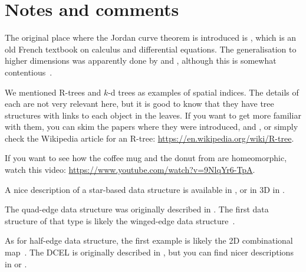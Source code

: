 %
\section{Notes and comments}

The original place where the Jordan curve theorem is introduced is  \citet{Jordan87}, which is an old French textbook on calculus and differential equations.
The generalisation to higher dimensions was apparently done by \citet{Lebesgue11} and \citet{Brouwer11}, although this is somewhat contentious~\citep[Ch.~5]{van-Dalen13}.

We mentioned R-trees and \(k\)-d trees as examples of spatial indices.
The details of each are not very relevant here, but it is good to know that they have tree structures with links to each object in the leaves.
If you want to get more familiar with them, you can skim the papers where they were introduced, \citet{Guttman84} and \citet{Bentley75}, or simply check the Wikipedia article for an R-tree: \url{https://en.wikipedia.org/wiki/R-tree}.

If you want to see how the coffee mug and the donut from  are homeomorphic, watch this video: \url{https://www.youtube.com/watch?v=9NlqYr6-TpA}.

A nice description of a star-based data structure is available in \citet{Blandford05}, or in 3D in \citet{Ledoux13a}.

The quad-edge data structure was originally described in \citet{Guibas85}.
The first data structure of that type is likely the winged-edge data structure~\citet{Baumgart75}.

As for half-edge data structure, the first example is likely the 2D combinational map~\citep{Edmonds60}.
The DCEL is originally described in \citet{Muller78}, but you can find nicer descriptions in \citet{Worboys04} or \citet{deBerg08}.






